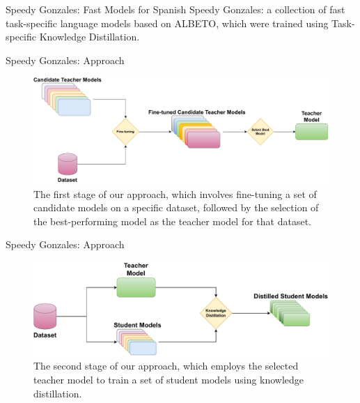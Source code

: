 \documentclass[aspectratio=169,xcolor=dvipsnames]{beamer}
\begin{document}
\begin{frame}{Speedy Gonzales: Fast Models for Spanish}
\centering
\large{Speedy Gonzales: a collection of fast task-specific language models based on ALBETO, which were trained using Task-specific Knowledge Distillation.}
\end{frame}
\begin{frame}{Speedy Gonzales: Approach}

\begin{figure}
    \centering
    \includegraphics[width=\columnwidth]{images/KD-approach-single-dataset-first-stage.pdf}
    \caption{The first stage of our approach, which involves fine-tuning a set of candidate models on a specific dataset, followed by the selection of the best-performing model as the teacher model for that dataset.}
    \label{fig:KD-approach-single-dataset-first-stage}
\end{figure}

\end{frame}
\begin{frame}{Speedy Gonzales: Approach}

\begin{figure}
    \centering
    \includegraphics[width=\columnwidth]{images/KD-approach-single-dataset-second-stage.pdf}
    \caption{The second stage of our approach, which employs the selected teacher model to train a set of student models using knowledge distillation.}
    \label{fig:KD-approach-single-dataset-second-stage}
\end{figure}

\end{frame}
\end{document}
